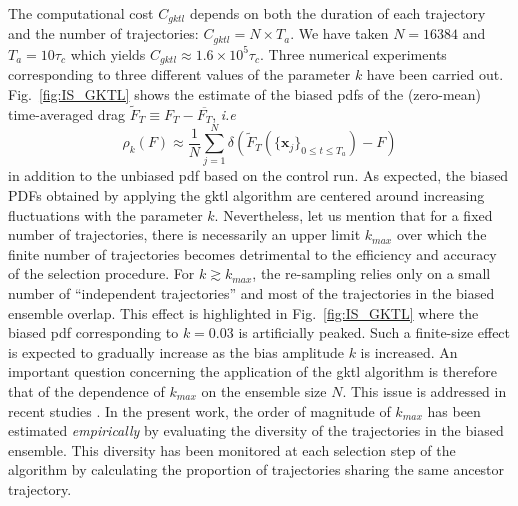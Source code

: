 \documentclass{jfm}
\begin{document}
The computational cost $C_{{gktl}}$ depends on both the duration of each trajectory and the number of trajectories: $C_{gktl} = N \times T_a$.
We have taken $N=16384$ and $T_a = 10\tau_c$ which yields $C_{gktl} \approx 1.6 \times 10^5 \tau_c$.
%
%
Three numerical experiments corresponding to three different values of the parameter $k$ have been carried out.
%
%
%
%
Fig.~\ref{fig:IS_GKTL} shows the estimate of the biased \ac{pdf}s of the (zero-mean) time-averaged drag $\tilde F_T \equiv F_T - \overline{F_T}$, \emph{i.e}
\begin{equation}
\label{eq:estimate_biased_measure}
\rho_k(F) 
\approx \frac{1}{N}\sum_{j=1}^{N}\delta(\tilde F_{T}(\{\mathbf{x}_j\}_{0\leq t \leq T_a}) - F)
\end{equation}
in addition to the unbiased \ac{pdf} based on the control run.
As expected, the biased PDFs obtained by applying the \ac{gktl} algorithm are centered around increasing fluctuations with the parameter $k$.
%
%
Nevertheless, let us mention that for a fixed number of trajectories, there is necessarily an upper limit $k_{max}$ over which the finite number of trajectories becomes detrimental to the efficiency and accuracy of the selection procedure.
%
For $k \gtrsim k_{max}$, the re-sampling relies only on a small number of ``independent trajectories'' and most of the trajectories in the biased ensemble overlap. 
This effect is highlighted in Fig.~\ref{fig:IS_GKTL} where the biased \ac{pdf} corresponding to $k=0.03$ is artificially peaked.
%
Such a finite-size effect is expected to gradually increase as the bias amplitude $k$ is increased.
%
An important question concerning the application of the \ac{gktl} algorithm is therefore that of the dependence of $k_{max}$ on the ensemble size $N$. This issue is addressed in recent studies \citep{nemoto2017finite,Guevara_Hidalgo_2018}.
%
In the present work, the order of magnitude of $k_{max}$ has been estimated \emph{empirically} by evaluating the diversity of the trajectories in the biased ensemble.
This diversity has been monitored at each selection step of the algorithm by calculating the proportion of trajectories sharing the same ancestor trajectory.
\end{document}

